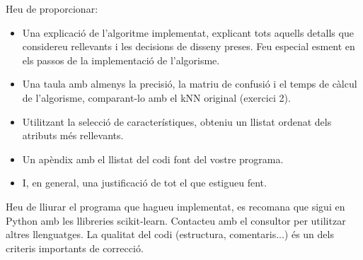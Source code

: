 \documentclass{article} %
\begin{document}
Heu de proporcionar:
\begin{itemize}
	\item Una explicació de l’algoritme implementat, explicant tots aquells detalls que considereu rellevants i les decisions de disseny preses. Feu especial esment en els passos de la implementació de l’algorisme.
	\item Una taula amb almenys la precisió, la matriu de confusió i el temps de càlcul de l’algorisme, comparant-lo amb el kNN original (exercici 2).
	\item Utilitzant la selecció de característiques, obteniu un llistat ordenat dels atributs més rellevants.
	\item Un apèndix amb el llistat del codi font del vostre programa.
	\item I, en general, una justificació de tot el que estigueu fent.
\end{itemize}

Heu de lliurar el programa que hagueu implementat, es recomana que sigui en Python amb les llibreries scikit-learn. Contacteu amb el consultor per utilitzar altres llenguatges. La qualitat del codi (estructura, comentaris...) és un dels criteris importants de correcció. \\
\end{document}
